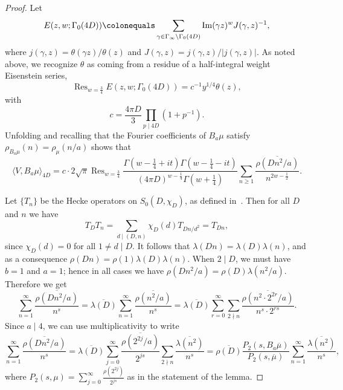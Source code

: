 \documentclass[11pt,reqno,oneside]{amsart}
\theoremstyle{plain}
\theoremstyle{definition}
\DeclareMathOperator{\im}{Im}
\DeclareMathOperator*{\Res}{Res}
\begin{document}
\begin{proof}
  Let
  \[
    E(z,w; \Gamma_0(4D)) \colonequals \sum_{\gamma \in \Gamma_{\infty}
      \backslash \Gamma_0(4D)} \im(\gamma z)^w J(\gamma, z)^{-1},
  \]
  where $j(\gamma, z) = \theta(\gamma z) / \theta(z)$ and
  $J(\gamma, z) = j(\gamma, z)/ \lvert j(\gamma, z)\rvert$.
  As noted above, we recognize $\theta$ as coming from a residue of a
  half-integral weight Eisenstein series,
  \[
    \Res_{w = \frac{3}{4}} E(z,w; \Gamma_0(4D)) = c^{-1} y^{1/4} \theta(z),
  \]
  with
  \[
    c = \frac{4 \pi D}{3} \prod_{p \mid 4D} (1 + p^{-1}).
  \]
  Unfolding and recalling that the Fourier coefficients of $B_a \mu$ satisfy
  $\rho_{B_a \mu}(n) = \rho_{\mu}(n / a)$ shows that
  \[
    \langle V, B_a \mu \rangle_{4D} = c \cdot 2 \sqrt{\pi} \Res_{w = \frac{3}{4}}
    \frac{\Gamma(w - \tfrac{1}{4} + it) \Gamma(w - \tfrac{1}{4} - it)}
    {(4 \pi D)^{w - \tfrac{1}{4}}\Gamma(w + \tfrac{1}{4})}
    \sum_{n \ge 1}
    \frac{\overline{\rho(Dn^2/a)}}{n^{2w-\tfrac{1}{2}}}.
  \]

  Let $\{T_n \}$ be the Hecke operators on $S_0(D, \chi_{D})$, as defined
  in~\cite[\S6]{dfi}.
  Then for all $D$ and $n$ we have
  \[
    T_{D} T_{n} = \sum_{d \mid (D, n)} \chi_{D}(d) T_{Dn/d^2} = T_{Dn},
  \]
  since $\chi_{D}(d) = 0$ for all $1 \ne d \mid D$.
  It follows that $\lambda(Dn) = \lambda(D) \lambda(n)$, and as a consequence
  $\rho(Dn) = \rho(1) \lambda(D) \lambda(n)$. When $2 \mid D$, we must have
  $b = 1$ and $a = 1$;
  hence in all cases we have $\rho(Dn^2/a) = \rho(D) \lambda(n^2/a)$.
  Therefore we get
  \[
    \sum_{n=1}^{\infty} \frac{\overline{\rho(Dn^2/a)}}{n^s}
    = \overline{\lambda(D)} \sum_{n=1}^{\infty}
    \frac{\overline{\rho(n^2/a)}}{n^s}
    = \overline{\lambda(D)} \sum_{r=0}^{\infty} \sum_{2 \nmid n}
    \frac{\overline{\rho(n^2 \cdot  2^{2r}/a)}}{n^s \cdot 2^{rs}}.
  \]
  Since $a \mid 4$, we can use multiplicativity to write
  \[
    \sum_{n=1}^{\infty} \frac{\overline{\rho(Dn^2/a)}}{n^s}
    =  \overline{\lambda(D)} \sum_{j=0}^{\infty} \frac{\overline{\rho(2^{2j}/a)}}{2^{js}}
    \sum_{2 \nmid n} \frac{\overline{\lambda(n^2)}}{n^s}
    =  \overline{\rho(D)}
    \frac{P_2(s, B_a \overline{\mu})}{P_2(s, \overline{\mu})}
    \sum_{n=1}^{\infty} \frac{\overline{\lambda(n^2)}}{n^s},
  \]
  where $P_2(s, \mu) = \sum_{j=0}^{\infty} \frac{\rho(2^{2j})}{2^{js}}$ as
  in the statement of the lemma.


\end{proof}
\end{document}
